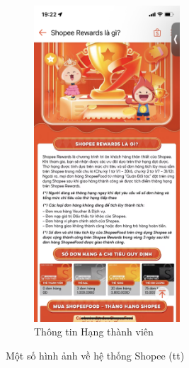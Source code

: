 \begin{figure}[H]
\begin{subfigure}[b]{0.4\textwidth}
        \includegraphics[width=0.6\textwidth]{Hạng_thành_viên2.PNG}
        \caption{Thông tin Hạng thành viên}
    \end{subfigure}
    \caption{Một số hình ảnh về hệ thống Shopee (tt)}
\end{figure}
